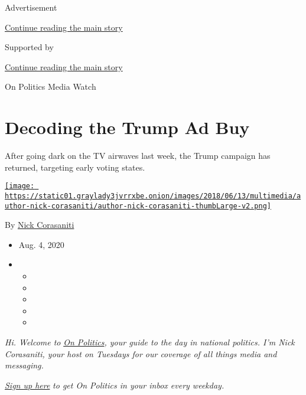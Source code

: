 Advertisement

\protect\hyperlink{after-top}{Continue reading the main story}

Supported by

\protect\hyperlink{after-sponsor}{Continue reading the main story}

On Politics Media Watch

\hypertarget{decoding-the-trump-ad-buy}{%
\section{Decoding the Trump Ad Buy}\label{decoding-the-trump-ad-buy}}

After going dark on the TV airwaves last week, the Trump campaign has
returned, targeting early voting states.

\href{https://www.nytimes3xbfgragh.onion/by/nick-corasaniti}{\texttt{[image: https://static01.graylady3jvrrxbe.onion/images/2018/06/13/multimedia/author-nick-corasaniti/author-nick-corasaniti-thumbLarge-v2.png]}}

By \href{https://www.nytimes3xbfgragh.onion/by/nick-corasaniti}{Nick
Corasaniti}

\begin{itemize}
\item
  Aug. 4, 2020
\item
  \begin{itemize}
  \item
  \item
  \item
  \item
  \item
  \end{itemize}
\end{itemize}

\emph{Hi. Welcome to}
\href{https://nl.nytimes3xbfgragh.onion/f/a/zarSo8aO-mBP32V6vtzLuw~~/AAAAAQA~/RgRfpIqEP0TSaHR0cHM6Ly93d3cubnl0aW1lcy5jb20vc3BvdGxpZ2h0L29uLXBvbGl0aWNzP3RlPTEmbmw9b24tcG9saXRpY3Mgd2l0aCBsaXNhIGxlcmVyJmVtYz1lZGl0X2NuXzIwMTkxMTA1P2NhbXBhaWduX2lkPTU2Jmluc3RhbmNlX2lkPTEzNjQxJnNlZ21lbnRfaWQ9MTg1NDcmdXNlcl9pZD1iNTA4ZWUwOTdhYWY0NWE5N2IxYmEwZTc5Y2QwNjg0ZSZyZWdpX2lkPTYzMjU0MTc0VwNueXRCCgAehAXCXTVeoxVSH25pY2hvbGFzLmNvcmFzYW5pdGlAbnl0aW1lcy5jb21YBAAAAAA~}{\emph{On
Politics}}\emph{, your guide to the day in national politics. I'm Nick
Corasaniti, your host on Tuesdays for our coverage of all things media
and messaging.}

\href{https://www.nytimes3xbfgragh.onion/newsletters/politics?module=inline}{\emph{Sign
up here}} \emph{to get On Politics in your inbox every weekday.}

